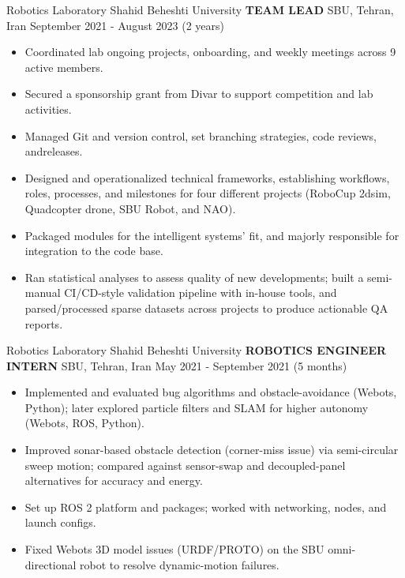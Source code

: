 \begin{cventries}
    \cventry
    {Robotics Laboratory \textemdash Shahid Beheshti University}
    {\textbf{TEAM LEAD}}
    {SBU, Tehran, Iran}
    {September 2021 - August 2023 (2 years)}
    {
        \begin{itemize}
            \item Coordinated lab ongoing projects, onboarding, and weekly meetings across 9 active members.
            \item Secured a sponsorship grant from Divar to support competition and lab activities.
            \item Managed Git and version control, set branching strategies, code reviews, andreleases.
            \item Designed and operationalized technical frameworks, establishing workflows, roles, processes, and milestones for four different projects (RoboCup 2dsim, Quadcopter drone, SBU Robot, and NAO).
            \item Packaged modules for the intelligent systems' fit, and majorly responsible for integration to the code base.
            \item Ran statistical analyses to assess quality of new developments; built a semi-manual CI/CD-style validation pipeline with in-house tools, and parsed/processed sparse datasets across projects to produce actionable QA reports.
        \end{itemize}
    }
\end{cventries}

\begin{cventries}
    \cventry
    {Robotics Laboratory \textemdash Shahid Beheshti University}
    {\textbf{ROBOTICS ENGINEER INTERN}}
    {SBU, Tehran, Iran}
    {May 2021 - September 2021 (5 months)}
    {
        \begin{itemize}
            \item Implemented and evaluated bug algorithms and obstacle-avoidance (Webots, Python); later explored particle filters and SLAM for higher autonomy (Webots, ROS, Python).
            \item Improved sonar-based obstacle detection (corner-miss issue) via semi-circular sweep motion; compared against sensor-swap and decoupled-panel alternatives for accuracy and energy.
            \item Set up ROS 2 platform and packages; worked with networking, nodes, and launch configs.
            \item Fixed Webots 3D model issues (URDF/PROTO) on the SBU omni-directional robot to resolve dynamic-motion failures.
        \end{itemize}
    }
\end{cventries}


